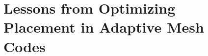 
\chapter{Lessons from Optimizing Placement in Adaptive Mesh Codes}
\label{chap:amr-paper}
\minitoc



% 






% 


